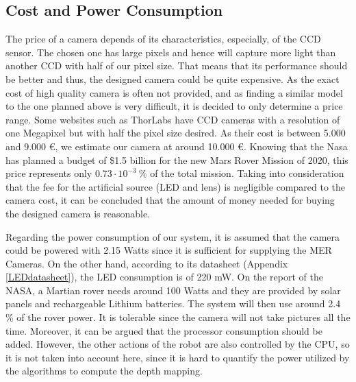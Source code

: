 \subsection{Cost and Power Consumption}
The price of a camera depends of its characteristics, especially, of the CCD sensor. The chosen one has large pixels and hence will capture more light than another CCD with half of our pixel size. That means that its performance should be better and thus, the designed camera could be quite expensive. As the exact cost of high quality camera is often not provided, and as finding a similar model to the one planned above is very difficult, it is decided to only determine a price range. Some websites such as ThorLabs have CCD cameras with a resolution of one Megapixel but with half the pixel size desired. As their cost is between 5.000 and 9.000 \euro, we estimate our camera at around 10.000 \euro. Knowing that the Nasa has planned a budget of \$1.5 billion for the new Mars Rover Mission of 2020, this price represents only $0.73\cdot 10^{-3} \ \%$ of the total mission. Taking into consideration that the fee for the artificial source (LED and lens) is negligible compared to the camera cost, it can be concluded that the amount of money needed for buying the designed camera is reasonable.

Regarding the power consumption of our system, it is assumed that the camera could be powered with 2.15 Watts since it is sufficient for supplying the MER Cameras. On the other hand, according to its datasheet (Appendix \ref{LEDdatasheet}), the LED consumption is of 220 mW. On the report of the NASA, a Martian rover needs around 100 Watts and they are provided by solar panels and rechargeable Lithium batteries. The system will then use around 2.4 \% of the rover power. It is tolerable since the camera will not take pictures all the time. Moreover, it can be argued that the processor consumption should be added. However, the other actions of the robot are also controlled by the CPU, so it is not taken into account here, since it is hard to quantify the power utilized by the algorithms to compute the depth mapping.